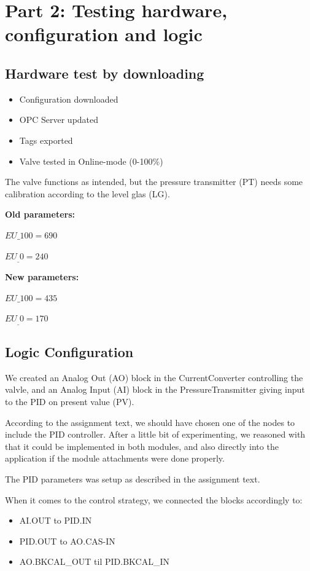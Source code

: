 \newpage
\section{Part 2: Testing hardware, configuration and logic}
\subsection{Hardware test by downloading}
\begin{itemize}
    \item{Configuration downloaded}
    \item{OPC Server updated}
    \item{Tags exported}
    \item{Valve tested in Online-mode (0-100\%)}
\end{itemize}


The valve functions as intended, but the pressure transmitter (PT) needs some calibration according to the level glas (LG).

\textbf{Old parameters:}

$EU\_100 = 690$

$EU_\_0 = 240$

\textbf{New parameters:}

$EU\_100 = 435$

$EU_\_0 = 170$






\subsection{Logic Configuration}
We created an Analog Out (AO) block in the CurrentConverter controlling the valvle, and an Analog Input (AI) block in the PressureTransmitter giving input to the PID on present value (PV).

According to the assignment text, we should have chosen one of the nodes to include the PID controller. After a little bit of experimenting, we reasoned with that it could be implemented in both modules, and also directly into the application if the module attachments were done properly.

The PID parameters was setup as described in the assignment text.

When it comes to the control strategy, we connected the blocks accordingly to:
\begin{itemize}
    \item{AI.OUT to PID.IN}
    \item{PID.OUT to AO.CAS-IN}
    \item{AO.BKCAL\_OUT til PID.BKCAL\_IN}
\end{itemize}


